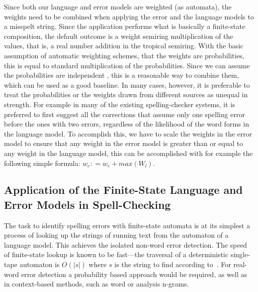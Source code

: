\documentclass[a4paper,12pt]{article}
\begin{document}
Since both our language and error models are weighted (as automata), the
weights need to be combined when applying the error and the language models to
a misspelt string. Since the application performs what is basically a
finite-state composition, the default outcome is a weight semiring
multiplication of the values, that is, a real number addition in the tropical
semiring. With the basic assumption of automatic weighting schemes, that the
weights are probabilities, this is equal to standard multiplication of the
probabilities. Since we can assume the probabilities are independent
\cite[]{church1991probability}, this is a reasonable way to combine them, which
can be used as a good baseline. In many cases, however, it is preferable to
treat the probabilities or the weights drawn from different sources as unequal
in strength. For example in many of the existing spelling-checker systems, it
is preferred to first suggest all the corrections that assume only one
spelling error before the ones  with two errors, regardless of the likelihood
of the word forms in the language model. To accomplish this, we have to scale
the weights in the error model to ensure that any weight in the error model is
greater than or equal to any weight in the language model, this can be
accomplished with for example the following simple formula: $w_e
\mathrel{\mathop:}= w_e + max(W_l)$.

\subsection{Application of the Finite-State Language and Error Models in
Spell-Checking}

The task to identify spelling errors with finite-state automata is at its
simplest a process of looking up the strings of running text from the automaton
of a language model. This achieves the isolated non-word error detection. The
speed of finite-state lookup is known to be fast---the traversal of a
deterministic single-tape automaton is $O(|s|)$ where $s$ is the string to find
according to~\cite{aho2007compilers}.  For real-word error detection a
probability based approach would be required, as well as in context-based
methods, such as word or analysis n-grams.
\end{document}
